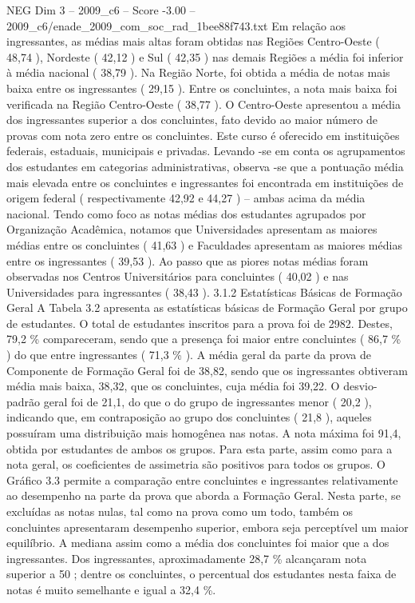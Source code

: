 \begin{textsample}{NEG Dim 3 – 2009\_c6 – Score -3.00 – 2009\_c6/enade\_2009\_com\_soc\_rad\_1bee88f743.txt}
Em relação aos ingressantes, as médias mais altas foram obtidas nas Regiões Centro-Oeste ( 48,74 ), Nordeste ( 42,12 ) e Sul ( 42,35 ) nas demais Regiões a média foi inferior à média nacional ( 38,79 ).
Na Região Norte, foi obtida a média de notas mais baixa entre os ingressantes ( 29,15 ).
Entre os concluintes, a nota mais baixa foi verificada na Região Centro-Oeste ( 38,77 ).
O Centro-Oeste apresentou a média dos ingressantes superior a dos concluintes, fato devido ao maior número de provas com nota zero entre os concluintes.
Este curso é oferecido em instituições federais, estaduais, municipais e privadas.
Levando -se em conta os agrupamentos dos estudantes em categorias administrativas, observa -se que a pontuação média mais elevada entre os concluintes e ingressantes foi encontrada em instituições de origem federal ( respectivamente 42,92 e 44,27 ) – ambas acima da média nacional.
Tendo como foco as notas médias dos estudantes agrupados por Organização Acadêmica, notamos que Universidades apresentam as maiores médias entre os concluintes ( 41,63 ) e Faculdades apresentam as maiores médias entre os ingressantes ( 39,53 ).
Ao passo que as piores notas médias foram observadas nos Centros Universitários para concluintes ( 40,02 ) e nas Universidades para ingressantes ( 38,43 ). 3.1.2 Estatísticas Básicas de Formação Geral A Tabela 3.2 apresenta as estatísticas básicas de Formação Geral por grupo de estudantes.
O total de estudantes inscritos para a prova foi de 2982.
Destes, 79,2 \% compareceram, sendo que a presença foi maior entre concluintes ( 86,7 \% ) do que entre ingressantes ( 71,3 \% ).
A média geral da parte da prova de Componente de Formação Geral foi de 38,82, sendo que os ingressantes obtiveram média mais baixa, 38,32, que os concluintes, cuja média foi 39,22.
O desvio-padrão geral foi de 21,1, do que o do grupo de ingressantes menor ( 20,2 ), indicando que, em contraposição ao grupo dos concluintes ( 21,8 ), aqueles possuíram uma distribuição mais homogênea nas notas.
A nota máxima foi 91,4, obtida por estudantes de ambos os grupos.
Para esta parte, assim como para a nota geral, os coeficientes de assimetria são positivos para todos os grupos.
O Gráfico 3.3 permite a comparação entre concluintes e ingressantes relativamente ao desempenho na parte da prova que aborda a Formação Geral.
Nesta parte, se excluídas as notas nulas, tal como na prova como um todo, também os concluintes apresentaram desempenho superior, embora seja perceptível um maior equilíbrio.
A mediana assim como a média dos concluintes foi maior que a dos ingressantes.
Dos ingressantes, aproximadamente 28,7 \% alcançaram nota superior a 50 ; dentre os concluintes, o percentual dos estudantes nesta faixa de notas é muito semelhante e igual a 32,4 \%.

\end{textsample}

